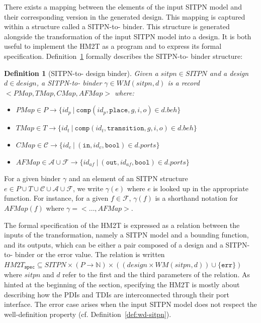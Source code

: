 \documentclass[pdflatex,sn-mathphys]{sn-jnl}%
\theoremstyle{thmstyleone}%
\theoremstyle{thmstyletwo}%
\theoremstyle{thmstylethree}%
\newtheorem{definition}{Definition}%
\begin{document}
There exists a mapping between the elements of the input SITPN model
and their corresponding version in the generated \hvhdl{} design. This
mapping is captured within a structure called a SITPN-to-\hvhdl{}
binder.  This structure is generated alongside the transformation of
the input SITPN model into a \hvhdl{} design. It is both useful to
implement the HM2T as a program and to express its formal
specification. Definition~\ref{def:sitpn-to-hvhdl-binder} formally
describes the SITPN-to-\hvhdl{} binder structure:
\begin{definition}[SITPN-to-\hvhdl{} design binder]
  \label{def:sitpn-to-hvhdl-binder}
  Given a $sitpn\in{}SITPN$ and a \hvhdl{} design $d\in{}design$, a
  SITPN-to-\hvhdl{} binder $\gamma\in{}WM(sitpn,d)$ is a record
  ${<}PMap,TMap,CMap,AFMap{>}$ where:
  \begin{itemize}
  \item $PMap\in{}P\rightarrow{}\{id_p~|~\mathtt{comp}(id_p,\mathtt{place},g,i,o)\in{}d.beh\}$
  \item $TMap\in{}T\rightarrow{}\{id_t~|~\mathtt{comp}(id_t,\mathtt{transition},g,i,o)\in{}d.beh\}$
  \item $CMap\in\mathcal{C}\rightarrow\{id_c~|~(\mathtt{in}, id_c, \mathtt{bool})\in{}d.ports\}$
  \item $AFMap\in\mathcal{A}\cup\mathcal{F}\rightarrow\{id_{af}~|~(\mathtt{out}, id_{af}, \mathtt{bool})\in{}d.ports\}$
  \end{itemize}
\end{definition}

For a given binder $\gamma$ and an element of an SITPN structure
$e\in{}P\cup{}T\cup\mathcal{C}\cup\mathcal{A}\cup\mathcal{F}$, we
write $\gamma(e)$ where $e$ is looked up in the appropriate
function. For instance, for a given $f\in\mathcal{F}$, $\gamma(f)$ is
a shorthand notation for $AFMap(f)$ where $\gamma={<}\dots,AFMap{>}$.

\bigskip

The formal specification of the HM2T is expressed as a relation
between the inputs of the transformation, namely a SITPN model and a
bounding function, and its outputs, which can be either a pair
composed of a \hvhdl{} design and a SITPN-to-\hvhdl{} binder or the
error value. The relation is written
$HM2T_{\mathtt{spec}}\subseteq{}SITPN\times(P\rightarrow\mathbb{N})\times{}((design\times{}WM(sitpn,d))\cup\{\mathtt{err}\})$
where $sitpn$ and $d$ refer to the first and the third parameters of
the relation. As hinted at the beginning of the section, specifying
the HM2T is mostly about describing how the PDIs and TDIs are
interconnected through their port interface. The error case arises
when the input SITPN model does not respect the well-definition
property (cf. Definition~\ref{def:wd-sitpn}).
\end{document}
